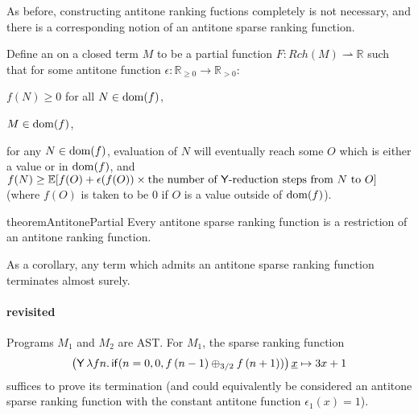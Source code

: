 As before, constructing antitone ranking fuctions completely is not necessary, and there is a corresponding notion of an antitone sparse ranking function.

\begin{definition}
Define an  on a closed term $M$ to be a partial function $F : Rch(M) \rightharpoonup \mathbb{R}$ such that for some antitone function $\epsilon : \mathbb{R}_{\geq 0} \to \mathbb{R}_{>0}$:
\begin{inparaenum}[(i)]
\item $f(N) \geq 0$ for all $N \in \operatorname{dom}(f)$,
\item $M \in \operatorname{dom}(f)$,
\item for any $N \in \operatorname{dom}(f)$, evaluation of $N$ will eventually reach some $O$ which is either a value or in $\operatorname{dom}(f)$, and $f(N) \geq \mathbb E [f(O) + \epsilon(f(O)) \times \text{the number of $\mathsf{Y}$-reduction steps from $N$ to $O$}]$ (where $f(O)$ is taken to be 0 if $O$ is a value outside of $\operatorname{dom}(f)$).
\end{inparaenum}
\end{definition}

\begin{restatable}{theorem}{AntitonePartial}  \label{thm:antitone partial implies rankable}
  Every antitone sparse ranking function is a restriction of an antitone ranking function.
\end{restatable}

As a corollary, any term which admits an antitone sparse ranking function terminates almost surely.

\paragraph*{ revisited}
Programs $M_1$ and $M_2$ are AST. For $M_1$, the sparse ranking function 
\begin{align*}
\big(\mathsf{Y} \, \lambda f n . \, \mathsf{if}(n=0, 0, f \, (n-1) \oplus_{3/2} f \, (n+1))\big) \, \underline x \mapsto 3x + 1
\end{align*}
suffices to prove its termination (and could equivalently be considered an antitone sparse ranking function with the constant antitone function $\epsilon_1(x) = 1$).

